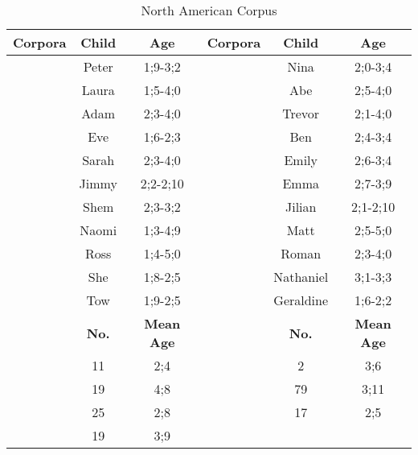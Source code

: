 \begin{table}[h1]
\small
\centering
\caption{North American Corpus} 
\begin{adjustbox}
\begin{tabular}{c|c|c|c|c|c}
\textbf{Corpora}  & \textbf{Child}  & \textbf{Age} &
\textbf{Corpora}  & \textbf{Child}  & \textbf{Age}\\
\hline
\cite{bloom1974imitation}  & Peter   & 1;9-3;2 & \cite{suppes1974semantics} &  Nina & 2;0-3;4
\\
\cite{braunwald1971mother}  & Laura   & 1;5-4;0 & \cite{kuczaj1978children} &  Abe & 2;5-4;0 \\
\multirow{}{}{\cite{brown1973first}} & Adam & 2;3-4;0 & \cite{demetras1986working} & Trevor & 2;1-4;0\\
& Eve & 1;6-2;3 & \multirow{}{}{\cite{Weist2009}} & Ben & 2;4-3;4 \\
& Sarah & 2;3-4;0 & &Emily & 2;6-3;4\\
\cite{demetras1989changes} & Jimmy & 2;2-2;10 & & Emma & 2;7-3;9\\
\cite{clark1978awareness} & Shem & 2;3-3;2 &  & Jilian & 2;1-2;10\\
\cite{sachs1983talking}& Naomi & 1;3-4;9 & & Matt & 2;5-5;0\\
\cite{macwhinney2014childes} & Ross & 1;4-5;0 & & Roman & 2;3-4;0\\
\multirow{}{}{\cite{post1993language}}& She & 1;8-2;5 & \cite{Snow1990child} & Nathaniel & 3;1-3;3\\
&Tow&1;9-2;5&\cite{hayes1988vocabulary}&Geraldine&1;6-2;2\\
\hline
\hline
& \textbf{No.} & \textbf{Mean Age} & & \textbf{No.} & \textbf{Mean Age}\\
\cite{bates1991first}  & 11  & 2;4 &
\cite{bohannon1977children}  & 2 & 3;6\\
\cite{gleason1980acquisition}&19&4;8&\cite{snow1995shell}&79&3;11\\
\cite{snow1989imitativeness}&25&2;8&\cite{valian1991syntactic}&17&2;5\\
\cite{van1980effects}&19&3;9\\
\end{tabular}
\end{adjustbox}
\end{table}


